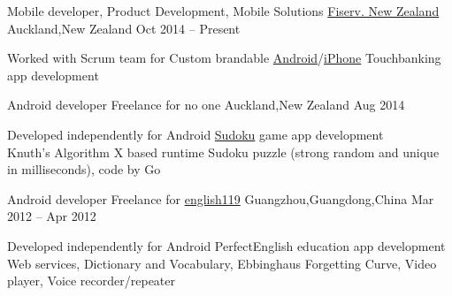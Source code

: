 
\begin{cventries}
	\cventry
	{Mobile developer, Product Development, Mobile Solutions}
	{\href{https://www.careers.fiserv.com/new-zealand}{Fiserv. New Zealand}}
	{Auckland,\enskip New Zealand}
	{Oct 2014 – Present}
	{
		\begin{cvitems}
			\item {Worked with Scrum team for Custom brandable \href{https://play.google.com/store/apps/details?id=com.fiserv.touchbankingasp&hl=en}{Android}/\href{https://itunes.apple.com/us/app/touchbanking/id386678211?mt=8}{iPhone} Touchbanking app development}
		\end{cvitems}
	}
\end{cventries}

\begin{cventries}
	\cventry
	{Android developer}
	{Freelance for no one}
	{Auckland,\enskip New Zealand}
	{Aug 2014}
	{
		\begin{cvitems}
			\item {Developed independently for Android \href{https://play.google.com/store/apps/details?id=com.gmail.jiangyang5157.sudoku}{Sudoku} game app development\\
			Knuth's Algorithm X based runtime Sudoku puzzle (strong random and unique in milliseconds), code by Go}
		\end{cvitems}
	}
\end{cventries}

\begin{cventries}
	\cventry
	{Android developer}
	{Freelance for \href{http://www.english119.cn}{english119}}
	{Guangzhou,\enskip Guangdong,\enskip China}
	{Mar 2012 – Apr 2012}
	{
		\begin{cvitems}
			\item {Developed independently for Android PerfectEnglish education app development\\
				Web services, Dictionary and Vocabulary, Ebbinghaus Forgetting Curve, Video player, Voice recorder/repeater}
		\end{cvitems}
	}
\end{cventries}

